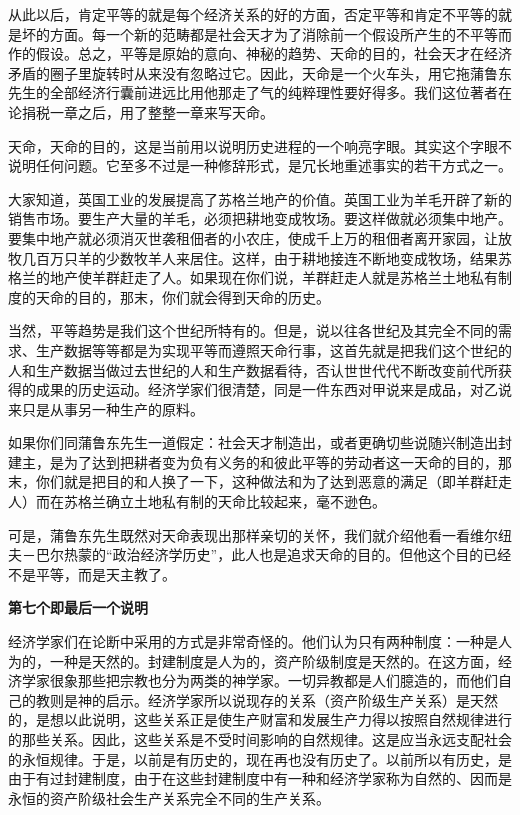 \documentclass[a4paper,twoside,12pt]{ctexart}
\begin{document}
从此以后，肯定平等的就是每个经济关系的好的方面，否定平等和肯定不平等的就是坏的方面。每一个新的范畴都是社会天才为了消除前一个假设所产生的不平等而作的假设。总之，平等是原始的意向、神秘的趋势、天命的目的，社会天才在经济矛盾的圈子里旋转时从来没有忽略过它。因此，天命是一个火车头，用它拖蒲鲁东先生的全部经济行囊前进远比用他那走了气的纯粹理性要好得多。我们这位著者在论捐税一章之后，用了整整一章来写天命。

天命，天命的目的，这是当前用以说明历史进程的一个响亮字眼。其实这个字眼不说明任何问题。它至多不过是一种修辞形式，是冗长地重述事实的若干方式之一。

大家知道，英国工业的发展提高了苏格兰地产的价值。英国工业为羊毛开辟了新的销售市场。要生产大量的羊毛，必须把耕地变成牧场。要这样做就必须集中地产。要集中地产就必须消灭世袭租佃者的小农庄，使成千上万的租佃者离开家园，让放牧几百万只羊的少数牧羊人来居住。这样，由于耕地接连不断地变成牧场，结果苏格兰的地产使羊群赶走了人。如果现在你们说，羊群赶走人就是苏格兰土地私有制度的天命的目的，那末，你们就会得到天命的历史。

当然，平等趋势是我们这个世纪所特有的。但是，说以往各世纪及其完全不同的需求、生产数据等等都是为实现平等而遵照天命行事，这首先就是把我们这个世纪的人和生产数据当做过去世纪的人和生产数据看待，否认世世代代不断改变前代所获得的成果的历史运动。经济学家们很清楚，同是一件东西对甲说来是成品，对乙说来只是从事另一种生产的原料。

如果你们同蒲鲁东先生一道假定：社会天才制造出，或者更确切些说随兴制造出封建主，是为了达到把耕者变为负有义务的和彼此平等的劳动者这一天命的目的，那末，你们就是把目的和人换了一下，这种做法和为了达到恶意的满足（即羊群赶走人）而在苏格兰确立土地私有制的天命比较起来，毫不逊色。

可是，蒲鲁东先生既然对天命表现出那样亲切的关怀，我们就介绍他看一看维尔纽夫－巴尔热蒙的“政治经济学历史”，此人也是追求天命的目的。但他这个目的已经不是平等，而是天主教了。

\begin{center}
    \textbf{第七个即最后一个说明}
\end{center}

经济学家们在论断中采用的方式是非常奇怪的。他们认为只有两种制度：一种是人为的，一种是天然的。封建制度是人为的，资产阶级制度是天然的。在这方面，经济学家很象那些把宗教也分为两类的神学家。一切异教都是人们臆造的，而他们自己的教则是神的启示。经济学家所以说现存的关系（资产阶级生产关系）是天然的，是想以此说明，这些关系正是使生产财富和发展生产力得以按照自然规律进行的那些关系。因此，这些关系是不受时间影响的自然规律。这是应当永远支配社会的永恒规律。于是，以前是有历史的，现在再也没有历史了。以前所以有历史，是由于有过封建制度，由于在这些封建制度中有一种和经济学家称为自然的、因而是永恒的资产阶级社会生产关系完全不同的生产关系。
\end{document}

